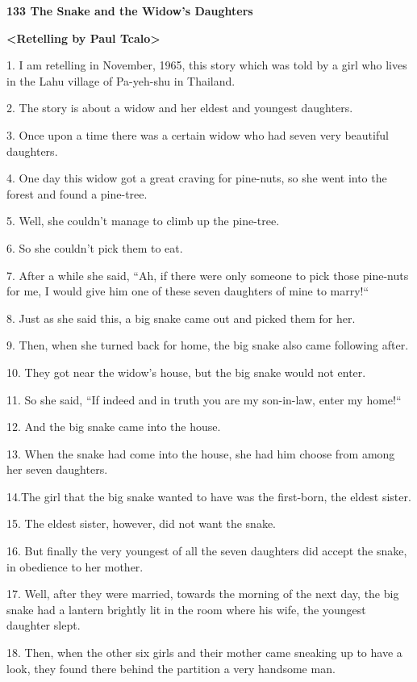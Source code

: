 
{\LARGE{}\textbf{133 The Snake and the Widow's Daughters}}

{\LARGE{}\textbf{<Retelling by Paul Tcalo>}}

{\LARGE{}1. I am retelling in November, 1965, this story which was told by a girl
who lives in the Lahu village of Pa-yeh-shu in Thailand.}

{\LARGE{}2. The story is about a widow and her eldest and youngest daughters.}

{\LARGE{}3. Once upon a time there was a certain widow who had seven very beautiful
daughters. }

{\LARGE{}4. One day this widow got a great craving for pine-nuts, so she went into
the forest and found a pine-tree. }

{\LARGE{}5. Well, she couldn't manage to climb up the pine-tree. }

{\LARGE{}6. So she couldn't pick them to eat. }

{\LARGE{}7. After a while she said, ``Ah, if there were only someone to
pick those pine-nuts for me, I would give him one of these seven daughters of mine
to marry!`` }

{\LARGE{}8. Just as she said this, a big snake came out and picked them for her.}

{\LARGE{}9. Then, when she turned back for home, the big snake also came following
after.}

{\LARGE{}10. They got near the widow's house, but the big snake would not enter.
}

{\LARGE{}11. So she said, ``If indeed and in truth you are my son-in-law,
enter my home!`` }

{\LARGE{}12. And the big snake came into the house. }

{\LARGE{}13. When the snake had come into the house, she had him choose from among
her seven daughters. }

{\LARGE{}14.The girl that the big snake wanted to have was the first-born, the
eldest sister. }

{\LARGE{}15. The eldest sister, however, did not want the snake. }

{\LARGE{}16. But finally the very youngest of all the seven daughters did accept
the snake, in obedience to her mother. }

{\LARGE{}17. Well, after they were married, towards the morning of the next day,
the big snake had a lantern brightly lit in the room where his wife, the youngest
daughter slept. }

{\LARGE{}18. Then, when the other six girls and their mother came sneaking up to
have a look, they found there behind the partition a very handsome man. }

